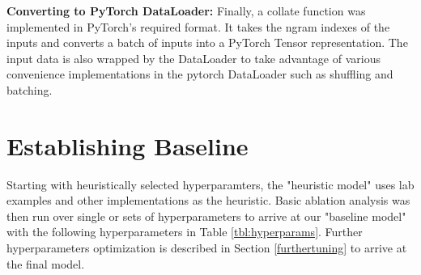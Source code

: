 \documentclass[a4paper,10pt]{article}
\begin{document}
\par
\justify
\textbf{Converting to PyTorch DataLoader:} Finally, a collate function was implemented in PyTorch's required format. It takes the ngram indexes of the inputs and converts a batch of inputs into a PyTorch Tensor representation. The input data is also wrapped by the DataLoader to take advantage of various convenience implementations in the pytorch DataLoader such as shuffling and batching.

\section{Establishing Baseline}
Starting with heuristically selected hyperparamters, the "heuristic model" uses lab examples and other implementations as the heuristic. Basic ablation analysis was then run over single or sets of hyperparameters to arrive at our "baseline model" with the following hyperparameters in Table \ref{tbl:hyperparams}.  Further hyperparameters optimization is described in Section \ref{furthertuning} to arrive at the final model.
\end{document}

